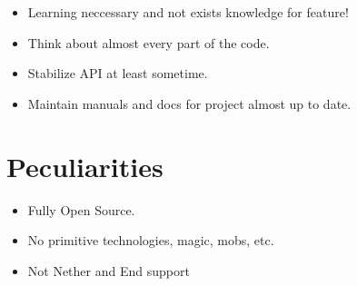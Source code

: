 \documentclass[12pt]{article}
\begin{document}
	\begin{itemize}
		\item Learning neccessary and not exists knowledge for feature!
		\item Think about almost every part of the code.
		\item Stabilize API at least sometime.
		\item Maintain manuals and docs for project almost up to date.
	\end{itemize}

	\section{Peculiarities}

	\begin{itemize}
		\item Fully Open Source.
		\item No primitive technologies, magic, mobs, etc.
		\item Not Nether and End support
	\end{itemize}
\end{document}
